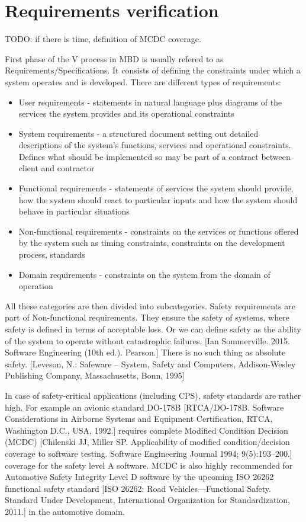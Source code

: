 \section{Requirements verification}
TODO: if there is time, definition of MCDC coverage.

First phase of the V process in MBD is usually refered to as Requirements/Specifications. It consists of defining the constraints under which a system operates and is developed. There are different types of requirements:

\begin{itemize}
	\item User requirements - statements in natural language plus diagrams of the services the system provides and its operational constraints
	\item System requirements - a structured document setting out detailed descriptions of the system’s functions, services and operational constraints. Defines what should be implemented so may be part of a contract between client and contractor
	\item Functional requirements - statements of services the system should provide, how the system should react to particular inputs and how the system should behave in particular situations
	\item Non-functional requirements - constraints on the services or functions offered by the system such as timing constraints, constraints on the development process, standards
	\item Domain requirements - constraints on the system from the domain of operation
\end{itemize}

All these categories are then divided into subcategories. Safety requirements are part of Non-functional requirements. They ensure the safety of systems, where safety is defined in terms of acceptable loss. Or we can define safety as the ability of the system to operate without catastrophic failures. [Ian Sommerville. 2015. Software Engineering (10th ed.). Pearson.] There is no such thing as absolute safety. [Leveson, N.: Safeware – System, Safety and Computers, Addison-Wesley Publishing Company, Massachusetts, Bonn, 1995]

In case of safety-critical applications (including CPS), safety standards are rather high. For example an avionic standard DO-178B [RTCA/DO-178B. Software Considerations in Airborne Systems and Equipment Certification, RTCA, Washington D.C., USA, 1992.] requires complete Modified Condition Decision (MCDC) [Chilenski JJ, Miller SP. Applicability of modified condition/decision coverage to software testing. Software Engineering Journal 1994; 9(5):193–200.] coverage for the safety level A software. MCDC is also highly recommended for Automotive Safety Integrity Level D software by the upcoming ISO 26262 functional safety standard [ISO 26262: Road Vehicles—Functional Safety. Standard Under Development, International Organization for Standardization, 2011.] in the automotive domain.

